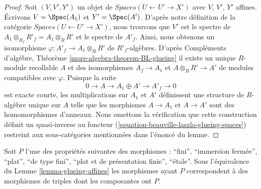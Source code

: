 \begin{proof}
Soit $(V, V', Y')$ un objet de
$\textit{Spaces}(U \leftarrow U' \to X')$
avec $V$, $V'$, $Y'$ affines.
Écrivons $V = \Spec(A_1)$ et $Y' = \Spec(A')$. D'après notre définition de la
catégorie $\textit{Spaces}(U \leftarrow U' \to X')$, nous trouvons que
$V'$ est le spectre de $A_1 \otimes_{R_f} R'_f = A_1 \otimes_R R'$
et le spectre de $A'_f$. Ainsi, nous obtenons un isomorphisme
$\varphi : A'_f \to A_1 \otimes_R R'$ de $R'_f$-algèbres.
D'après Compléments d'algèbre, Théorème \ref{more-algebra-theorem-BL-glueing}
il existe un unique $R$-module recollable $A$ et des isomorphismes
$A_f \to A_1$ et $A \otimes_R R' \to A'$ de modules compatibles avec
$\varphi$. Puisque la suite
$$
0 \to A \to A_1 \oplus A' \to A'_f \to 0
$$
est exacte courte, les multiplications sur $A_1$ et $A'$ définissent
une structure de $R$-algèbre unique sur $A$ telle que les morphismes $A \to A_1$
et $A \to A'$ sont des homomorphismes d'anneaux. Nous omettons la vérification que cette construction définit un quasi-inverse au foncteur
(\ref{equation-beauville-laszlo-glueing-spaces})
restreint aux sous-catégories mentionnées dans l'énoncé du lemme.
\end{proof}

\begin{lemma}
\label{lemma-glueing-affines-etale}
Soit $P$ l'une des propriétés suivantes des morphismes :
``fini'', ``immersion fermée'', ``plat'', ``de type fini'',
``plat et de présentation finie'', ``\'etale''.
Sous l'équivalence du Lemme \ref{lemma-glueing-affines}
les morphismes ayant $P$ correspondent à des morphismes de triples
dont les composantes ont $P$.
\end{lemma}


